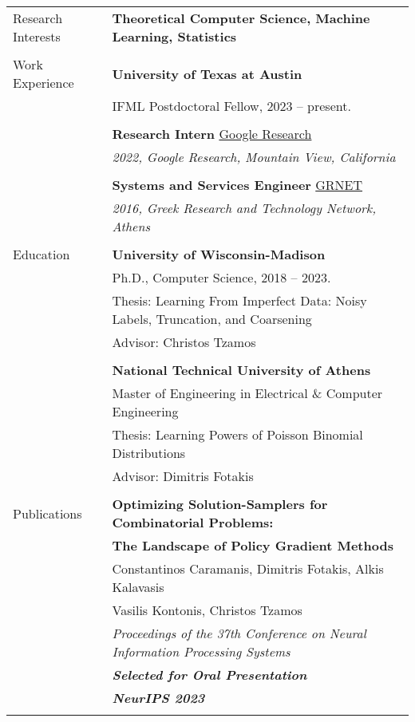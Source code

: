 \documentclass[letterpaper,11pt,oneside]{article}
\begin{document}
\noindent \begin{longtable}{@{} l l}
\Large{Research Interests} & \textbf{Theoretical Computer Science, Machine Learning, Statistics}
\\
&\\

\Large{Work Experience}

  & \textbf{University of Texas at Austin} \\
  & IFML Postdoctoral Fellow, 2023 -- present. \\
  & \\

  &\textbf{Research Intern} \href{https://research.google}{Google Research}\\
  & \emph{2022, Google Research, Mountain View, California}\\
  &\\
  
  &\textbf{Systems and Services Engineer} \href{https://grnet.gr/}{GRNET}\\
  & \emph{2016, Greek Research and Technology Network, Athens}\\
  &\\

 \Large{Education}


     & \textbf{University of Wisconsin-Madison} \\
     & Ph.D., Computer Science, 2018 -- 2023. \\
     & Thesis: Learning From Imperfect Data: Noisy Labels, Truncation, and Coarsening \\
     & Advisor: Christos Tzamos\\
     & \\

     & \textbf{National Technical University of Athens} \\
     & Master of Engineering in Electrical \& Computer Engineering\\
     & Thesis: Learning Powers of Poisson Binomial Distributions\\
     & Advisor: Dimitris Fotakis \\
     & \\

 \Large{Publications}

 &\textbf{Optimizing Solution-Samplers for Combinatorial Problems:}\\
 &\textbf{The Landscape of Policy Gradient Methods}\\
 & Constantinos Caramanis, Dimitris Fotakis, Alkis Kalavasis\\
 & Vasilis Kontonis, Christos Tzamos\\
 & \emph{Proceedings of the 37th Conference on Neural Information Processing Systems} \\
 & \emph{\textbf{Selected for Oral Presentation}} \\
 & \emph{\textbf{NeurIPS 2023}} \\
 & \\


\end{longtable}
\end{document}
